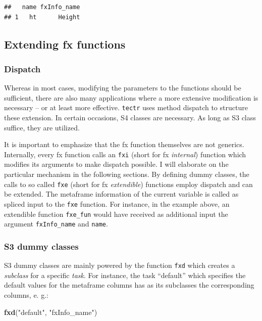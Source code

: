 \documentclass[]{report}
\newenvironment{Shaded}{\begin{snugshade}}{\end{snugshade}}
\newcommand{\KeywordTok}[1]{\textcolor[rgb]{0.13,0.29,0.53}{\textbf{#1}}}
\newcommand{\StringTok}[1]{\textcolor[rgb]{0.31,0.60,0.02}{#1}}
\newcommand{\NormalTok}[1]{#1}
\theoremstyle{definition}
\theoremstyle{definition}
\theoremstyle{definition}
\theoremstyle{remark}
\begin{document}
\begin{verbatim}
##   name fxInfo_name
## 1   ht      Height
\end{verbatim}

\subsection{Extending fx functions}\label{extending-fx-functions}

\subsubsection{Dispatch}\label{dispatch}

Whereas in most cases, modifying the parameters to the functions should
be sufficient, there are also many applications where a more extensive
modification is necessary -- or at least more effective. \texttt{tectr}
uses method dispatch to structure these extension. In certain occasions,
S4 classes are necessary. As long as S3 class suffice, they are
utilized.

It is important to emphasize that the fx function themselves are not
generics. Internally, every fx function calls an \texttt{fxi} (short for
fx \emph{internal}) function which modifies its arguments to make
dispatch possible. I will elaborate on the particular mechanism in the
following sections. By defining dummy classes, the calls to so called
\texttt{fxe} (short for fx \emph{extendible}) functions employ dispatch
and can be extended. The metaframe information of the current variable
is called as spliced input to the \texttt{fxe} function. For instance,
in the example above, an extendible function \texttt{fxe\_fun} would
have received as additional input the argument \texttt{fxInfo\_name} and
\texttt{name}.

\subsubsection{S3 dummy classes}\label{s3-dummy-classes}

S3 dummy classes are mainly powered by the function \texttt{fxd} which
creates a \emph{subclass} for a specific \emph{task}. For instance, the
task ``default'' which specifies the default values for the metaframe
columns has as its subclasses the corresponding columns, e. g.:

\begin{Shaded}
\begin{Highlighting}[]
\KeywordTok{fxd}\NormalTok{(}\StringTok{"default"}\NormalTok{, }\StringTok{"fxInfo_name"}\NormalTok{)}
\end{Highlighting}
\end{Shaded}
\end{document}
